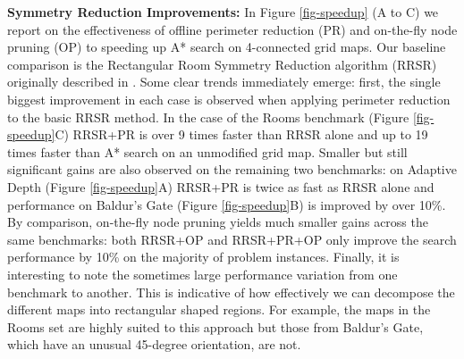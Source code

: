 \textbf{Symmetry Reduction Improvements: }
In Figure \ref{fig-speedup} (A to C) we report on the  
effectiveness of offline perimeter reduction (PR) and on-the-fly 
node pruning (OP) to speeding up A* search on 4-connected grid maps.
Our baseline comparison is the Rectangular Room Symmetry Reduction algorithm 
(RRSR) originally described in \cite{harabor10}.
Some clear trends immediately emerge: first, the single biggest improvement in each
case is observed when applying perimeter reduction to the basic RRSR method.
In the case of the Rooms benchmark (Figure \ref{fig-speedup}C) RRSR+PR is over 9
times faster than RRSR alone and up to 19 times faster than A* search on an unmodified
grid map.
Smaller but still significant gains are also observed on the remaining two benchmarks:
on Adaptive Depth (Figure \ref{fig-speedup}A) RRSR+PR is twice as fast as RRSR alone
and performance on Baldur's Gate (Figure \ref{fig-speedup}B) is improved by over 10\%.
By comparison, on-the-fly node pruning yields much smaller gains across the same benchmarks:
both RRSR+OP and RRSR+PR+OP only improve the search performance by 10\% on the majority
of problem instances.
Finally, it is interesting to note the sometimes large performance variation 
from one benchmark to another. This is indicative of how effectively we can 
decompose the different maps into rectangular shaped regions.
For example, the maps in the Rooms set are highly suited to this approach but those
from Baldur's Gate, which have an unusual 45-degree orientation, are not.

